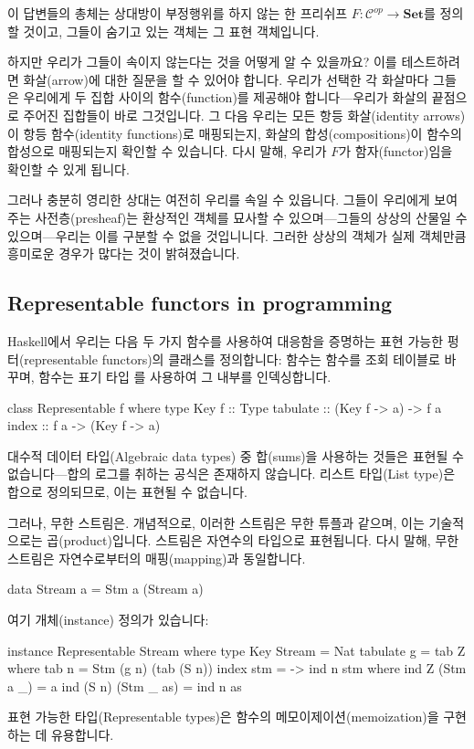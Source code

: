 \documentclass[DaoFP]{subfiles}
\begin{document}
이 답변들의 총체는 상대방이 부정행위를 하지 않는 한 프리쉬프 $F \colon \mathcal{C}^{op} \to \mathbf{Set}$를 정의할 것이고, 그들이 숨기고 있는 객체는 그 표현 객체입니다.

하지만 우리가 그들이 속이지 않는다는 것을 어떻게 알 수 있을까요? 이를 테스트하려면 화살(arrow)에 대한 질문을 할 수 있어야 합니다. 우리가 선택한 각 화살마다 그들은 우리에게 두 집합 사이의 함수(function)를 제공해야 합니다---우리가 화살의 끝점으로 주어진 집합들이 바로 그것입니다. 그 다음 우리는 모든 항등 화살(identity arrows)이 항등 함수(identity functions)로 매핑되는지, 화살의 합성(compositions)이 함수의 합성으로 매핑되는지 확인할 수 있습니다. 다시 말해, 우리가 $F$가 함자(functor)임을 확인할 수 있게 됩니다.

그러나 충분히 영리한 상대는 여전히 우리를 속일 수 있읍니다. 그들이 우리에게 보여주는 사전층(presheaf)는 환상적인 객체를 묘사할 수 있으며---그들의 상상의 산물일 수 있으며---우리는 이를 구분할 수 없을 것입니니다. 그러한 상상의 객체가 실제 객체만큼 흥미로운 경우가 많다는 것이 밝혀졌습니다.

\subsection{Representable functors in programming}

Haskell에서 우리는 다음 두 가지 함수를 사용하여 대응함을 증명하는 표현 가능한 펑터(representable functors)의 클래스를 정의합니다:  함수는 함수를 조회 테이블로 바꾸며,  함수는 표기 타입 를 사용하여 그 내부를 인덱싱합니다.

\begin{haskell}
class Representable f where
  type Key f :: Type
  tabulate :: (Key f -> a) -> f a
  index    :: f a -> (Key f -> a)
\end{haskell}

대수적 데이터 타입(Algebraic data types) 중 합(sums)을 사용하는 것들은 표현될 수 없습니다---합의 로그를 취하는 공식은 존재하지 않습니다. 리스트 타입(List type)은 합으로 정의되므로, 이는 표현될 수 없습니다.

그러나, 무한 스트림은. 개념적으로, 이러한 스트림은 무한 튜플과 같으며, 이는 기술적으로는 곱(product)입니다. 스트림은 자연수의 타입으로 표현됩니다. 다시 말해, 무한 스트림은 자연수로부터의 매핑(mapping)과 동일합니다.
\begin{haskell}
data Stream a = Stm a (Stream a)
\end{haskell}
여기 개체(instance) 정의가 있습니다:
\begin{haskell}
instance Representable Stream where
  type Key Stream = Nat
  tabulate g = tab Z
    where
      tab n = Stm (g n) (tab (S n))
  index stm = \n -> ind n stm
    where
      ind Z (Stm a _) = a
      ind (S n) (Stm _ as) = ind n as
\end{haskell}
표현 가능한 타입(Representable types)은 함수의 메모이제이션(memoization)을 구현하는 데 유용합니다.
\end{document}
